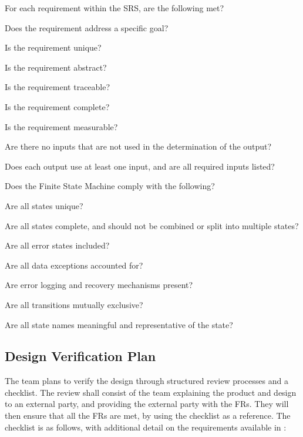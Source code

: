 \documentclass[12pt, titlepage]{article}
\begin{document}
\begin{todolist}
\label{SRS_Checklist}
\item For each requirement within the SRS, are the following met?
\begin{todolist}
    \item Does the requirement address a specific goal?
    \item Is the requirement unique? 
    \item Is the requirement abstract?
    \item Is the requirement traceable?
    \item Is the requirement complete?
    \item Is the requirement measurable?
    \item Are there no inputs that are not used in the determination of the output? 
    \item Does each output use at least one input, and are all required inputs listed?
\end{todolist}
\item Does the Finite State Machine comply with the following?
\begin{todolist}
    \item Are all states unique?
    \item Are all states complete, and should not be combined or split into multiple states?
    \item Are all error states included?
    \begin{todolist}
        \item Are all data exceptions accounted for?
        \item Are error logging and recovery mechanisms present?
    \end{todolist}
    \item Are all transitions mutually exclusive?
    \item Are all state names meaningful and representative of the state?
\end{todolist}
\end{todolist}

\subsection{Design Verification Plan}

The team plans to verify the design through structured review processes and a checklist. The review shall consist of the team explaining the product and design to an external party, and providing the external party with the FRs. They will then ensure that all the FRs are met, by using the checklist as a reference. The checklist is as follows, with additional detail on the requirements available in : 
\end{document}
